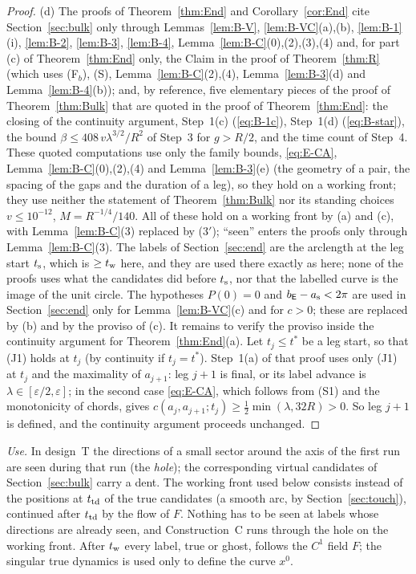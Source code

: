 \begin{proof}
(d) The proofs of Theorem~\ref{thm:End} and Corollary~\ref{cor:End} cite Section~\ref{sec:bulk} only through
Lemmas~\ref{lem:B-V}, \ref{lem:B-VC}(a),(b), \ref{lem:B-1}(i), \ref{lem:B-2}, \ref{lem:B-3}, \ref{lem:B-4},
Lemma~\ref{lem:B-C}(0),(2),(3),(4) and, for part (c) of Theorem~\ref{thm:End} only, the Claim in the proof of
Theorem~\ref{thm:R} (which uses \textup{(F$_b$)}, \textup{(S)}, Lemma~\ref{lem:B-C}(2),(4), Lemma~\ref{lem:B-3}(d) and
Lemma~\ref{lem:B-4}(b)); and, by reference, five elementary pieces of the proof of Theorem~\ref{thm:Bulk} that are quoted in the
proof of Theorem~\ref{thm:End}: the closing of the continuity argument, Step~1(c) (\eqref{eq:B-1c}), Step~1(d)
(\eqref{eq:B-star}), the bound $\beta\le408\,v\lambda^{3/2}/R^2$ of Step~3 for $g>R/2$, and the time count of Step~4. These
quoted computations use only the family bounds, \eqref{eq:E-CA}, Lemma~\ref{lem:B-C}(0),(2),(4) and Lemma~\ref{lem:B-3}(e) (the
geometry of a pair, the spacing of the gaps and the duration of a leg), so they hold on a working front; they use neither the
statement of Theorem~\ref{thm:Bulk} nor its standing choices $v\le10^{-12}$, $M=R^{-1/4}/140$. All of these hold on a working
front by (a) and (c), with Lemma~\ref{lem:B-C}(3) replaced by
\textup{($3'$)}; ``seen'' enters the proofs only through Lemma~\ref{lem:B-C}(3). The labels of Section~\ref{sec:end} are the
arclength at the leg start $t_{\mathrm s}$, which is $\ge t_{\mathrm w}$ here, and they are used there exactly as here; none of the proofs uses what
the candidates did before $t_{\mathrm s}$, nor that the labelled curve is the image of the unit circle. The hypotheses $P(0)=0$ and
$b_{\mathsf E}-a_{\mathrm s}<2\pi$ are used in Section~\ref{sec:end} only for Lemma~\ref{lem:B-VC}(c) and for $c>0$; these are replaced by
(b) and by the proviso of (c). It remains to verify the proviso inside the continuity argument for Theorem~\ref{thm:End}(a). Let
$t_j\le t^*$ be a leg start, so that (J1) holds at $t_j$ (by continuity if $t_j=t^*$). Step~1(a) of that proof uses only (J1) at
$t_j$ and the maximality of $a_{j+1}$: leg $j+1$ is final, or its label advance is $\lambda\in[\varepsilon/2,\varepsilon]$; in the
second case \eqref{eq:E-CA}, which follows from (S1) and the monotonicity of chords, gives
$c(a_j,a_{j+1};t_j)\ge\frac12\min(\lambda,32R)>0$. So leg $j+1$ is defined, and the continuity argument proceeds unchanged.
\end{proof}

\noindent\emph{Use.} In design~T the directions of a small sector around the axis of the first run are seen during that run (the
\emph{hole}); the corresponding virtual candidates of Section~\ref{sec:bulk} carry a dent. The working front used below consists
instead of the positions at $t_{\mathrm{td}}$ of the true candidates (a smooth arc, by Section~\ref{sec:touch}), continued after $t_{\mathrm{td}}$ by
the flow of $F$. Nothing has to be seen at labels whose directions are already seen, and Construction~C runs through the hole on
the working front. After $t_{\mathrm w}$ every label, true or ghost, follows the $C^1$ field $F$; the singular true dynamics is used only
to define the curve $x^0$.

